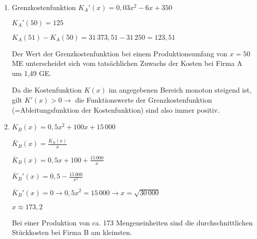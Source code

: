 \begin{langesbeispiel}
{\begin{enumerate}
	$K_B'(x)=x+100$
	
	$K_B''(x)=1>0$
	
	Da die zweite Ableitung positiv ist, ist die Funktion linksgekrümmt. Es liegt progressives Wachstum vor. 
	
	\textit{Andere richtige Begründungen (z.B. anhand des Graphen) sind auch zulässig.}
	
	$f(x)=ax^2+bx+c$
	
	Wenn $a>0$ ist, ist der Graph der Kostenfunktion linksgekrümmt. Es liegt progressives Wachstum vor.
	
	Wenn $a<0$ ist, ist der Graph der Kostenfunktion rechtsgekrümmt. Es liegt degressives Wachstum vor.
	
	\item Grenzkostenfunktion $K_A'(x)=0,03x^2-6x+350$
	
	$K_A'(50)=125$
	
	$K_A(51)-K_A(50)=31\,373,51-31\,250=123,51$
	
	Der Wert der Grenzkostenfunktion bei einem Produktionsumfang von $x=50$ ME unterscheidet sich vom tatsächlichen Zuwachs der Kosten bei Firma A um 1,49 GE.
	
	Da die Kostenfunktion $K(x)$ im angegebenen Bereich monoton steigend ist, gilt $K'(x)>0 \rightarrow$ die Funktionswerte der Grenzkostenfunktion (=Ableitungsfunktion der Kostenfunktion) sind also immer positiv.
	
	\item $K_B(x)=0,5x^2+100x+15\,000$
	
	$\overline{K}_B(x)=\frac{K_B(x)}{x}$
	
	$\overline{K}_B(x)=0,5x+100+\frac{15\,000}{x}$
	
	$\overline{K}_B'(x)=0,5-\frac{15\,000}{x^2}$
	
	$\overline{K}_B'(x)=0 \rightarrow 0,5x^2=15\,000 \rightarrow x=\sqrt{30\,000}$
	
	$x\approx 173,2$
	
	Bei einer Produktion von ca. 173 Mengeneinheiten sind die durchschnittlichen Stückkosten bei Firma B am kleinsten.
\end{enumerate}}
\end{langesbeispiel}